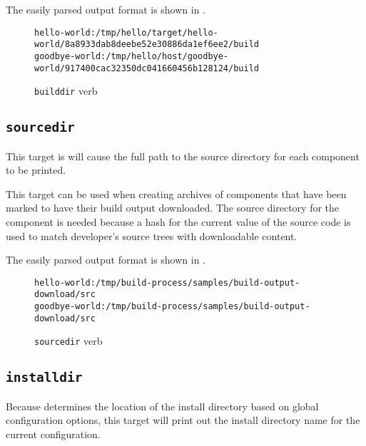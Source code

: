 The easily parsed output format is shown in
.

\begin{figure}[tbh]
\hrulefill
\begin{scriptsize}
\begin{verbatim}
hello-world:/tmp/hello/target/hello-world/8a8933dab8deebe52e30886da1ef6ee2/build
goodbye-world:/tmp/hello/host/goodbye-world/917400cac32350dc041660456b128124/build
\end{verbatim}
\end{scriptsize}
\hrulefill
\caption{\texttt{builddir} verb}\label{usinglmsbw:builddir-verb}
\end{figure}

\subsection{\texttt{sourcedir}}\label{usinglmsbw:sourcedir}

This target is will cause the full path to the source directory for
each component to be printed.

This target can be used when creating archives of components that have
been marked to have their build output downloaded.  The source
directory for the component is needed because a hash for the current
value of the source code is used to match developer's source trees
with downloadable content.

The easily parsed output format is shown in
.

\begin{figure}[tbh]
\hrulefill
\begin{footnotesize}
\begin{verbatim}
hello-world:/tmp/build-process/samples/build-output-download/src
goodbye-world:/tmp/build-process/samples/build-output-download/src
\end{verbatim}
\end{footnotesize}
\hrulefill
\caption{\texttt{sourcedir} verb}\label{usinglmsbw:sourcedir-verb}
\end{figure}


\subsection{\texttt{installdir}}\label{usinglmsbw:installdir}

Because \lmsbw determines the location of the install directory based
on global configuration options, this target will print out the
install directory name for the current configuration.

